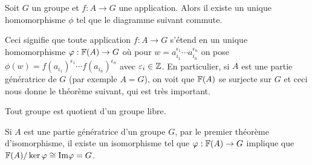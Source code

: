     Soit $G$ un groupe et $f:A \to G$ une application. Alors il existe un unique homomorphisme $\phi$ tel que
    le diagramme suivant commute.
    \begin{center}
    \end{center}
    Ceci signifie que toute application $f:A \to G$ s'étend en un unique homomorphisme $\varphi: \mathbb{F}(A) \to G$ où
    pour $w = a_{i_1}^{\epsilon_1} \cdots a_{i_n}^{\epsilon_n}$ on pose $\phi(w) = f(a_{i_1})^{\epsilon_1}
    \cdots f(a_{i_n})^{\epsilon_n}$ avec $\varepsilon_i \in \mathbb{Z}$. En particulier, si $A$ est une partie
    génératrice de $G$ (par exemple $A = G$), on voit que $\mathbb{F}(A)$ se surjecte sur $G$ et ceci nous donne le
    théorème suivant, qui est très important.

    \begin{theo} \label{theo-tt-grp-quotient-grp-libre}
      Tout groupe est quotient d'un groupe libre.
    \end{theo}

    \begin{preuve}
      Si $A$ est une partie génératrice d'un groupe $G$, par le premier théorème d'isomorphisme, il existe un
      isomorphisme tel que $\varphi: \mathbb{F}(A) \to G$ implique que $\mathbb{F}(A)/\ker \varphi \cong \mathrm{Im} \varphi = G$.
    \end{preuve}




  




